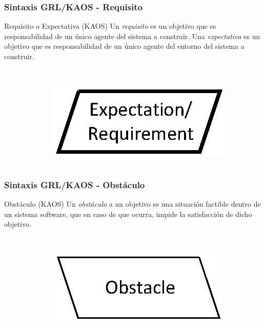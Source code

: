 \documentclass[slidestop,xcolor=pst,dvips,blue]{beamer}
\begin{document}
\begin{frame}[c]
    \frametitle{Sintaxis GRL/KAOS - Requisito}
    \begin{block}{Requisito o Expectativa (KAOS)}
        Un \alert{\emph{requisito}} es un objetivo que es responsabilidad de un único agente del sistema a construir. Una \alert{\emph{expectativa}} es un objetivo que es responsabilidad de un único agente del entorno del sistema a construir.
        \ \\
        \ \\
        \begin{columns}[c]
            \begin{column}{0.50\linewidth}
            \end{column}
            \begin{column}{0.50\linewidth}
                \centering \includegraphics[width=0.50\columnwidth,keepaspectratio=true]{images/objetivos/expectation(KAOS).eps}
            \end{column}
        \end{columns}
     \end{block}
\end{frame}

\begin{frame}[c]
    \frametitle{Sintaxis GRL/KAOS - Obstáculo}
    \begin{block}{Obstáculo (KAOS)}
        Un \alert{\emph{obstáculo}}  a un objetivo es una situación factible dentro de un sistema software, que en caso de que ocurra, impide la satisfacción de dicho objetivo.
        \ \\
        \ \\
        \begin{columns}[c]
            \begin{column}{0.50\linewidth}
            \end{column}
            \begin{column}{0.50\linewidth}
                \centering \includegraphics[width=0.50\columnwidth,keepaspectratio=true]{images/objetivos/obstacle(KAOS).eps}
            \end{column}
        \end{columns}
     \end{block}
\end{frame}
\end{document}
